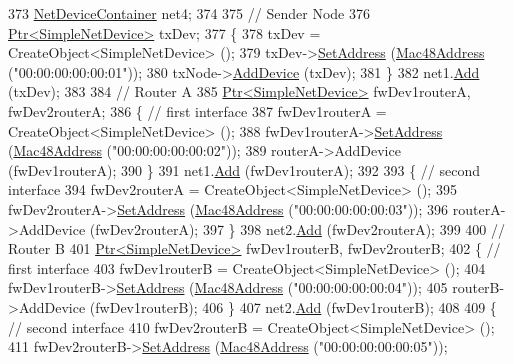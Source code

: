 \begin{DoxyCode}
373   \hyperlink{classns3_1_1NetDeviceContainer}{NetDeviceContainer} net4;
374 
375   \textcolor{comment}{// Sender Node}
376   \hyperlink{classns3_1_1Ptr}{Ptr<SimpleNetDevice>} txDev;
377   \{
378     txDev = CreateObject<SimpleNetDevice> ();
379     txDev->\hyperlink{classns3_1_1SimpleNetDevice_a968ef3e7318bac29d5f1d7d977029af4}{SetAddress} (\hyperlink{classns3_1_1Mac48Address}{Mac48Address} (\textcolor{stringliteral}{"00:00:00:00:00:01"}));
380     txNode->\hyperlink{classns3_1_1Node_a42ff83ee1d5d1649c770d3f5b62375de}{AddDevice} (txDev);
381   \}
382   net1.\hyperlink{classns3_1_1NetDeviceContainer_a7ca8bc1d7ec00fd4fcc63869987fbda5}{Add} (txDev);
383 
384   \textcolor{comment}{// Router A}
385   \hyperlink{classns3_1_1Ptr}{Ptr<SimpleNetDevice>} fwDev1routerA, fwDev2routerA;
386   \{ \textcolor{comment}{// first interface}
387     fwDev1routerA = CreateObject<SimpleNetDevice> ();
388     fwDev1routerA->\hyperlink{classns3_1_1SimpleNetDevice_a968ef3e7318bac29d5f1d7d977029af4}{SetAddress} (\hyperlink{classns3_1_1Mac48Address}{Mac48Address} (\textcolor{stringliteral}{"00:00:00:00:00:02"}));
389     routerA->AddDevice (fwDev1routerA);
390   \}
391   net1.\hyperlink{classns3_1_1NetDeviceContainer_a7ca8bc1d7ec00fd4fcc63869987fbda5}{Add} (fwDev1routerA);
392 
393   \{ \textcolor{comment}{// second interface}
394     fwDev2routerA = CreateObject<SimpleNetDevice> ();
395     fwDev2routerA->\hyperlink{classns3_1_1SimpleNetDevice_a968ef3e7318bac29d5f1d7d977029af4}{SetAddress} (\hyperlink{classns3_1_1Mac48Address}{Mac48Address} (\textcolor{stringliteral}{"00:00:00:00:00:03"}));
396     routerA->AddDevice (fwDev2routerA);
397   \}
398   net2.\hyperlink{classns3_1_1NetDeviceContainer_a7ca8bc1d7ec00fd4fcc63869987fbda5}{Add} (fwDev2routerA);
399 
400   \textcolor{comment}{// Router B}
401   \hyperlink{classns3_1_1Ptr}{Ptr<SimpleNetDevice>} fwDev1routerB, fwDev2routerB;
402   \{ \textcolor{comment}{// first interface}
403     fwDev1routerB = CreateObject<SimpleNetDevice> ();
404     fwDev1routerB->\hyperlink{classns3_1_1SimpleNetDevice_a968ef3e7318bac29d5f1d7d977029af4}{SetAddress} (\hyperlink{classns3_1_1Mac48Address}{Mac48Address} (\textcolor{stringliteral}{"00:00:00:00:00:04"}));
405     routerB->AddDevice (fwDev1routerB);
406   \}
407   net2.\hyperlink{classns3_1_1NetDeviceContainer_a7ca8bc1d7ec00fd4fcc63869987fbda5}{Add} (fwDev1routerB);
408 
409   \{ \textcolor{comment}{// second interface}
410     fwDev2routerB = CreateObject<SimpleNetDevice> ();
411     fwDev2routerB->\hyperlink{classns3_1_1SimpleNetDevice_a968ef3e7318bac29d5f1d7d977029af4}{SetAddress} (\hyperlink{classns3_1_1Mac48Address}{Mac48Address} (\textcolor{stringliteral}{"00:00:00:00:00:05"}));

\end{DoxyCode}
